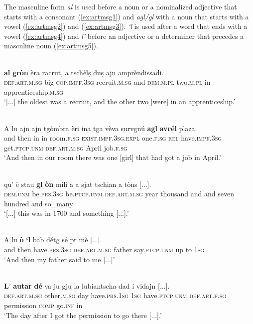 The masculine form \textit{al} is used before a noun or a nominalized adjective that starts with a consonant (\ref{ex:artmsg1}) and \textit{agl/gl} with a noun that starts with a vowel (\ref{ex:artmsg2}) and (\ref{ex:artmsg3}). \textit{`l} is used after a word that ends with a vowel (\ref{ex:artmsg4}) and \textit{l'} before an adjective or a determiner that precedes a masculine noun (\ref{ex:artmsg5}).

\ea\label{ex:artmsg1}
\\
\gll   [...] \textbf{al} \textbf{gròn} èra racrut, a tschèlṣ duṣ ajn amprèndissadi. \\
[...] \textsc{def.art.m.sg} big \textsc{cop.impf.3sg} recruit.\textsc{m.sg} and \textsc{dem.m.pl} two.\textsc{m.pl} in apprenticeship.\textsc{m.sg}\\
\glt `[...] the oldest was a recruit, and the other two [were] in an apprenticeship.'
\z

\ea\label{ex:artmsg2}
\\
\gll A lu ajn ajn tgòmbra èri ina tga vèva survgnú \textbf{agl} \textbf{avrél} plaza.\\
and then in in room.\textsc{f.sg} \textsc{exist.impf.3sg.expl} one.\textsc{f.sg} \textsc{rel} have.\textsc{impf.3sg} get.\textsc{ptcp.unm} \textsc{def.art.m.sg} April job.\textsc{f.sg}\\
\glt `And then in our room there was one [girl] that had got a job in April.'
\z

\ea
\label{ex:artmsg3}
\\
\gll [...] qu' è stau \textbf{gl} \textbf{òn} mili a a sjat tschian a tòns [...].\\
[...] \textsc{dem.unm} be.\textsc{prs.3sg} be.\textsc{ptcp.unm} \textsc{def.art.m.sg} year thousand and and seven hundred and so\_many\\
\glt `[...] this was in 1700 and something [...].'
\z

\ea\label{ex:artmsg4}
\\
\gll A lu \textbf{ò} \textbf{`l} bab détg sé pr mè [...].\\
and then have.\textsc{prs.3sg} \textsc{def.art.m.sg} father  say.\textsc{ptcp.unm} up to \textsc{1sg}\\
\glt `And then my father said to me [...]'
\z

\ea\label{ex:artmsg5}
\\
\gll  \textbf{L}’ \textbf{autar} \textbf{dé} va ju gju la lubiantscha dad í vidajn [...].  \\
 \textsc{def.art.m.sg} other.\textsc{m.sg} day have.\textsc{prs.1sg} \textsc{1sg} have.\textsc{ptcp.unm} \textsc{def.art.f.sg} permission \textsc{comp} go.\textsc{inf} in\\
\glt `The day after I got the permission to go there [...].'
\z

